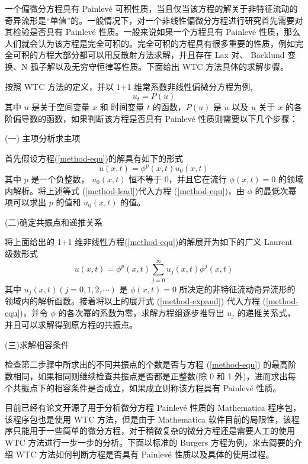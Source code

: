 一个偏微分方程具有 Painlev\'{e} 可积性质，当且仅当该方程的解关于非特征流动的奇异流形是“单值”的。一般情况下，对一个非线性偏微分方程进行研究首先需要对其检验是否具有  Painlev\'{e} 性质。一般来说如果一个方程具有 Painlev\'{e} 性质，那么人们就会认为该方程是完全可积的。完全可积的方程具有很多重要的性质，例如完全可积的方程大部分都可以用反散射方法求解，并且存在 Lax 对、 B\"{a}cklund 变换、N 孤子解以及无穷守恒律等性质。下面给出 WTC 方法具体的求解步骤。

按照 WTC 方法的定义，并以  1+1 维常系数非线性偏微分方程为例,
\begin{equation}
u_t=P(u)  \label{method-equ}
\end{equation}
其中 $u$ 是关于空间变量 $x$ 和 时间变量 $t$ 的函数，$P(u)$ 是 $u$ 以及 $u$ 关于 $x$ 的各阶偏导数的函数，如果判断该方程是否具有  Painlev\'{e} 性质则需要以下几个步骤：

(一) 主项分析求主项

首先假设方程(\ref{method-equ})的解具有如下的形式
\begin{equation}
u(x,t)=\phi^p(x,t) u_0(x,t) \label{method-lead}
\end{equation}
其中 $p$ 是一个负整数， $u_0(x,t)$ 恒不等于 0，并且它在流行 $\phi(x,t)=0$ 的领域内解析。将上述等式 (\ref{method-lead})代入方程 (\ref{method-equ})，由 $\phi$ 的最低次幂项可以求出 $p$ 的值和 $u_0(x,t)$ 的值。

(二)确定共振点和递推关系

将上面给出的 1+1 维非线性方程(\ref{method-equ})的解展开为如下的广义 Laurent 级数形式
\begin{equation}
u(x,t)=\phi^p(x,t)\sum_{j=0}^\infty u_j(x,t) \phi^j(x,t)   \label{method-expand}
\end{equation}
其中 $u_j(x,t)(j=0,1,2,\cdots)$ 是 $\phi(x,t)=0$ 所决定的非特征流动奇异流形的领域内的解析函数。接着将以上的展开式 (\ref{method-expand}) 代入方程 (\ref{method-equ})，并令 $\phi$ 的各次幂的系数为零，求解方程组逐步推导出 $u_j$ 的递推关系式，并且可以求解得到原方程的共振点。

(三)求解相容条件

检查第二步骤中所求出的不同共振点的个数是否与方程 (\ref{method-equ}) 的最高阶数相同，如果相同则继续检查共振点是否都是正整数(除 0 和  1 外)，进而求出每个共振点下的相容条件是否成立，如果成立则称该方程具有 Painlev\'{e} 性质。

目前已经有论文开源了用于分析微分方程 Painlev\'{e} 性质的 Mathematica 程序包，该程序包也是使用 WTC 方法，但是由于 Mathematica 软件目前的局限性，该程序只能用于一些简单的微分方程，对于稍微复杂的微分方程还是需要人工的使用 WTC 方法进行一步一步的分析。下面以标准的 Burgers 方程为例，来去简要的介绍 WTC 方法如何判断方程是否具有 Painlev\'{e} 性质以及具体的使用过程。

